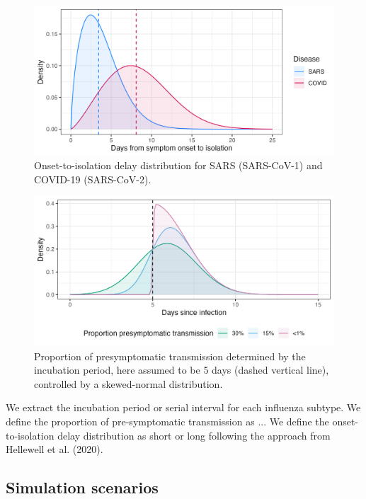\documentclass{article}
\begin{document}
\begin{figure}[h]
  \centering
  \includegraphics[width=\textwidth]{../plots/onset_to_isolation.png}
  \caption{Onset-to-isolation delay distribution for SARS (SARS-CoV-1) and
  COVID-19 (SARS-CoV-2).}
  \label{fig:onset-to-isolation}
\end{figure}


\begin{figure}[h]
  \centering
  \includegraphics[width=\textwidth]{../plots/prop_presymptomatic_transmission.png}
  \caption{Proportion of presymptomatic transmission determined by the incubation period, here assumed to be 5 days (dashed vertical line), controlled by a skewed-normal distribution.}
  \label{fig:prop-presym_trans}
\end{figure}

We extract the incubation period or serial interval for each influenza subtype. We define the proportion of pre-symptomatic transmission as ... We define the onset-to-isolation delay distribution as short or long following the approach from Hellewell et al. (2020).

\subsection{Simulation scenarios}
\end{document}
